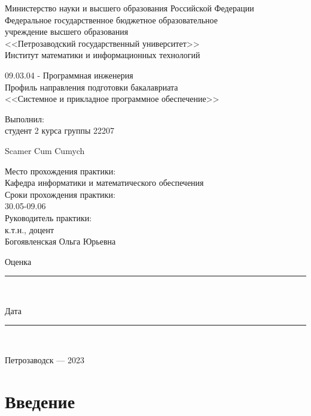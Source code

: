 \documentclass[a4paper,12pt]{article}
\newcommand{\myrule}[1]{\rule{#1}{0.4pt}}
\newcommand{\sign}[2][~]{{\small\myrule{#2}\\[-0.7em]\makebox[#2]{\it #1}}}
\renewcommand{\baselinestretch}{1.50}
\begin{document}
\thispagestyle{empty}
\begin{center}
\renewcommand{\baselinestretch}{1}
{\normalsize {Министерство науки и высшего образования Российской Федерации\\
Федеральное государственное бюджетное образовательное\\
учреждение высшего образования\\}
\large
{\sc <<Петрозаводский государственный университет>>\\
Институт математики и информационных технологий
}
}
\end{center}


\begin{center}
09.03.04 - Программная инженерия\\
Профиль направления подготовки бакалавриата\\
<<Системное и прикладное программное обеспечение>>\\
\end{center}

\vfill

\begin{center}
\medskip
	{\Large {}}
\end{center}

\vfill
\vfill
\vfill

\medskip

\begin{flushright}
\parbox{9cm}{%
\renewcommand{\baselinestretch}{1.2}
\normalsize
	Выполнил:\\
студент 2 курса группы 22207
\begin{flushright}
Scamer Cum Cumych
\end{flushright}
Место прохождения практики: \\
Кафедра информатики и математического обеспечения\\

Сроки прохождения практики: \\
30.05-09.06\\

Руководитель практики:\\
к.т.н., доцент\\
Богоявленская Ольга Юрьевна\\

\begin{flushright}
Оценка
  \sign[]{4cm}
\end{flushright}

\begin{flushright}
Дата
  \sign[]{4cm}
\end{flushright}
}
\end{flushright}

\vfill

\begin{center}
\large
    Петрозаводск --- 2023
\end{center}

\newpage
\tableofcontents

\newpage
\section*{Введение}


\newpage
{}
\begin{thebibliography}{}
	\bibitem{} {}
\end{thebibliography}
\end{document}

